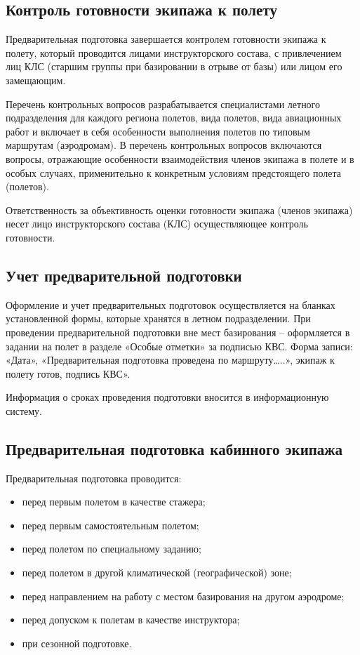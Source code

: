  


\subsection{Контроль готовности экипажа к полету}
\setcounter{subsect}{1}

Предварительная подготовка завершается контролем готовности экипажа к полету, который проводится лицами инструкторского состава, с привлечением лиц КЛС (старшим группы при базировании в отрыве от базы) или лицом его замещающим.

Перечень контрольных вопросов разрабатывается специалистами летного подразделения для каждого региона полетов, вида полетов, вида авиационных работ и включает в себя особенности выполнения полетов по типовым маршрутам (аэродромам). В перечень контрольных вопросов включаются вопросы, отражающие особенности взаимодействия членов экипажа в полете и в особых случаях, применительно к конкретным условиям предстоящего полета (полетов). 

Ответственность за объективность оценки готовности экипажа (членов экипажа) несет лицо инструкторского состава (КЛС) осуществляющее контроль готовности.

\subsection{Учет предварительной подготовки}
\setcounter{subsect}{1}

Оформление и учет предварительных подготовок осуществляется на бланках установленной формы, которые хранятся в летном подразделении. При проведении предварительной подготовки вне мест базирования – оформляется в задании на полет в разделе «Особые отметки» за подписью КВС. Форма записи: «Дата», «Предварительная подготовка проведена по маршруту…..», экипаж к полету готов, подпись КВС».

Информация о сроках проведения подготовки вносится в информационную систему.

\subsection{Предварительная подготовка кабинного экипажа}
\setcounter{subsect}{1}

Предварительная подготовка проводится:
\begin{itemize}
    \item перед первым полетом в качестве стажера;
    \item перед первым самостоятельным полетом;
    \item перед полетом по специальному заданию;
    \item перед полетом в другой климатической (географической) зоне;
    \item перед направлением на работу с местом базирования на другом аэродроме;
    \item перед допуском к полетам в качестве инструктора;
    \item при сезонной подготовке. 
\end{itemize}


